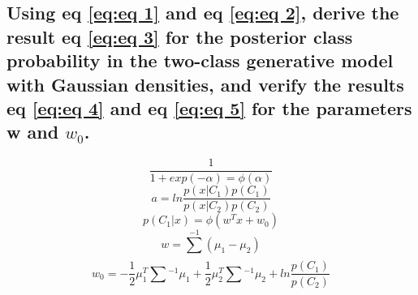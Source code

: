 \documentclass{article}
\begin{document}
	\subsection{Using eq \ref{eq:eq 1} and eq \ref{eq:eq 2}, derive the result eq \ref{eq:eq 3} for the posterior class
		probability in the two-class generative model with Gaussian densities, and verify the
		results eq \ref{eq:eq 4} and eq \ref{eq:eq 5} for the parameters w and $w_{0}$.}
		\begin{equation}
			\label{eq:eq 1}
			\frac{1}{1 + exp(-\alpha) = \phi(\alpha)}
		\end{equation}
		\begin{equation}
			\label{eq:eq 2}
			a = ln\frac{p(x|C_{1})p(C_{1})}{p(x|C_{2})p(C_{2})}	
		\end{equation}
		\begin{equation}
			\label{eq:eq 3}
			p(C_{1}|x) = \phi(w^{T}x + w_{0})
		\end{equation}
		\begin{equation}
			\label{eq:eq 4}
			w = \sum_{}^{-1}(\mu_{1} - \mu_{2})
		\end{equation}
		\begin{equation}
			\label{eq:eq 5}
			w_{0} = -\frac{1}{2}\mu^{T}_{1}\sum_{}^{}^{-1}\mu_{1} + \frac{1}{2}\mu_{2}^{T}\sum_{}^{}^{-1}\mu_{2} + ln\frac{p(C_{1})}{p(C_{2})}
		\end{equation}
		
\end{document}
